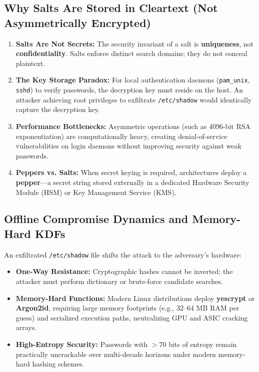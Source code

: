 \documentclass[11pt,a4paper]{article}
\begin{document}
\subsection{Why Salts Are Stored in Cleartext (Not Asymmetrically Encrypted)}
\begin{enumerate}
    \item \textbf{Salts Are Not Secrets:} The security invariant of a salt is \textbf{uniqueness}, not \textbf{confidentiality}. Salts enforce distinct search domains; they do not conceal plaintext.
    \item \textbf{The Key Storage Paradox:} For local authentication daemons (\texttt{pam\_unix}, \texttt{sshd}) to verify passwords, the decryption key must reside on the host. An attacker achieving root privileges to exfiltrate \texttt{/etc/shadow} would identically capture the decryption key.
    \item \textbf{Performance Bottlenecks:} Asymmetric operations (such as 4096-bit RSA exponentiation) are computationally heavy, creating denial-of-service vulnerabilities on login daemons without improving security against weak passwords.
    \item \textbf{Peppers vs. Salts:} When secret keying is required, architectures deploy a \textbf{pepper}---a secret string stored externally in a dedicated Hardware Security Module (HSM) or Key Management Service (KMS).
\end{enumerate}

\subsection{Offline Compromise Dynamics and Memory-Hard KDFs}
An exfiltrated \texttt{/etc/shadow} file shifts the attack to the adversary's hardware:
\begin{itemize}
    \item \textbf{One-Way Resistance:} Cryptographic hashes cannot be inverted; the attacker must perform dictionary or brute-force candidate searches.
    \item \textbf{Memory-Hard Functions:} Modern Linux distributions deploy \textbf{yescrypt} or \textbf{Argon2id}, requiring large memory footprints (e.g., 32--64 MB RAM per guess) and serialized execution paths, neutralizing GPU and ASIC cracking arrays.
    \item \textbf{High-Entropy Security:} Passwords with $>70$ bits of entropy remain practically uncrackable over multi-decade horizons under modern memory-hard hashing schemes.
\end{itemize}
\end{document}
